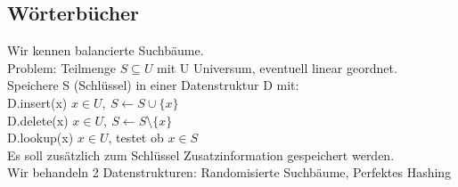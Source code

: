 \documentclass[a4paper]{article}
\begin{document}
\subsection{Wörterbücher}
Wir kennen balancierte Suchbäume.\\
Problem: Teilmenge $S\subseteq U$ mit U Universum, eventuell linear geordnet.\\ 
Speichere S (Schlüssel) in einer Datenstruktur D mit:\\
D.insert(x) $x\in U,\ S\leftarrow S\cup\{ x \}$\\
D.delete(x) $x\in U,\ S\leftarrow S\setminus \{x\}$\\
D.lookup(x) $x\in U$, testet ob $x\in S$\\
Es soll zusätzlich zum Schlüssel Zusatzinformation gespeichert werden.\\
Wir behandeln 2 Datenstrukturen: Randomisierte Suchbäume, Perfektes Hashing\\
\end{document}

